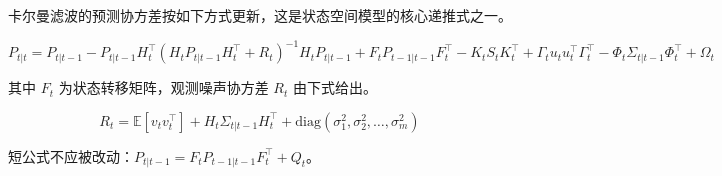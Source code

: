 \documentclass[11pt,a4paper,scheme=plain,fontset=fandol,no-math]{ctexart}
\newcommand{\trans}{^{\top}}
\begin{document}
卡尔曼滤波的预测协方差按如下方式更新，这是状态空间模型的核心递推式之一。

\begin{equation}\label{eq:kalman-update}
P_{t|t} = P_{t|t-1} - P_{t|t-1} H_t\trans \left( H_t P_{t|t-1} H_t\trans + R_t \right)^{-1} H_t P_{t|t-1} + F_t P_{t-1|t-1} F_t\trans - K_t S_t K_t\trans + \Gamma_t u_t u_t\trans \Gamma_t\trans - \Phi_t \Sigma_{t|t-1} \Phi_t\trans + \Omega_t
\end{equation}

其中 $F_t$ 为状态转移矩阵，观测噪声协方差 $R_t$ 由下式给出。

\begin{equation}
R_t = \mathbb{E}\left[ v_t v_t\trans \right] + H_t \Sigma_{t|t-1} H_t\trans + \mathrm{diag}\left( \sigma_1^2, \sigma_2^2, \ldots, \sigma_m^2 \right)
\end{equation}

短公式不应被改动：$P_{t|t-1} = F_t P_{t-1|t-1} F_t\trans + Q_t$。
\end{document}

